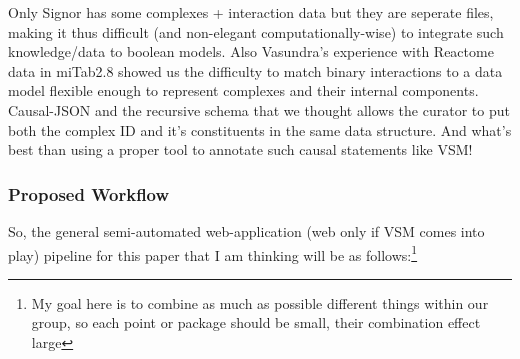 \documentclass[12pt,]{book}
\let\rmarkdownfootnote\footnote%
\def\footnote{\protect\rmarkdownfootnote}
\begin{document}
Only Signor has some complexes + interaction data but they are seperate files, making it thus difficult (and non-elegant computationally-wise) to integrate such knowledge/data to boolean models. Also Vasundra's experience with Reactome data in miTab2.8 showed us the difficulty to match binary interactions to a data model flexible enough to represent complexes and their internal components. Causal-JSON and the recursive schema that we thought allows the curator to put both the complex ID and it's constituents in the same data structure. And what's best than using a proper tool to annotate such causal statements like VSM!

\hypertarget{proposed-workflow}{%
\subsubsection*{Proposed Workflow}\label{proposed-workflow}}

So, the general semi-automated web-application (web only if VSM comes into play) pipeline for this paper that I am thinking will be as follows:\footnote{My goal here is to combine as much as possible different things within our group,
  so each point or package should be small, their combination effect large}
\end{document}

